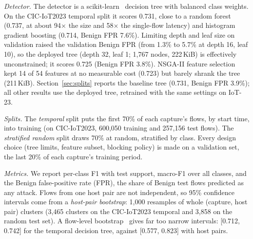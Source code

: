 \emph{Detector.} The detector is a scikit-learn~\cite{pedregosa2011sklearn} decision tree with balanced class weights. On the CIC-IoT2023 temporal split it scores 0.731, close to a random forest (0.737, at about 94$\times$ the size and 58$\times$ the single-flow latency) and histogram gradient boosting (0.714, Benign FPR 7.6\%). Limiting depth and leaf size on validation raised the validation Benign FPR (from 1.3\% to 5.7\% at depth 16, leaf 10), so the deployed tree (depth 32, leaf 1; 1,767 nodes, 222\,KiB) is effectively unconstrained; it scores 0.725 (Benign FPR 3.8\%). NSGA-II feature selection~\cite{deb2002nsga2,blank2020pymoo} kept 14 of 54 features at no measurable cost (0.723) but barely shrank the tree (211\,KiB). Section~\ref{sec:splits} reports the baseline tree (0.731, Benign FPR 3.9\%); all other results use the deployed tree, retrained with the same settings on IoT-23.

\emph{Splits.} The \emph{temporal} split puts the first 70\% of each capture's flows, by start time, into training (on CIC-IoT2023, 600,050 training and 257,156 test flows). The \emph{stratified random} split draws 70\% at random, stratified by class. Every design choice (tree limits, feature subset, blocking policy) is made on a validation set, the last 20\% of each capture's training period.

\emph{Metrics.} We report per-class F1 with test support, macro-F1 over all classes, and the Benign false-positive rate (FPR), the share of Benign test flows predicted as any attack. Flows from one host pair are not independent, so 95\% confidence intervals come from a \emph{host-pair bootstrap}: 1,000 resamples of whole (capture, host pair) clusters (3,465 clusters on the CIC-IoT2023 temporal and 3,858 on the random test set). A flow-level bootstrap~\cite{efron1994bootstrap} gives far too narrow intervals: [0.712, 0.742] for the temporal decision tree, against [0.577, 0.823] with host pairs.
